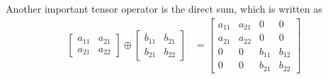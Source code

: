 Another important tensor operator is the direct sum, which is written as
\begin{align}
	\begin{bmatrix}
a_{11} & a_{21} \\
a_{21} & a_{22}
\end{bmatrix}
\oplus
\begin{bmatrix}
b_{11} & b_{21} \\
b_{21} & b_{22}
\end{bmatrix} &=
\begin{bmatrix}
a_{11} & a_{21} & 0 & 0\\
a_{21} & a_{22} & 0 & 0\\
0 & 0& b_{11} & b_{12}\\
0 & 0 & b_{21} & b_{22}
\end{bmatrix}
\end{align}

